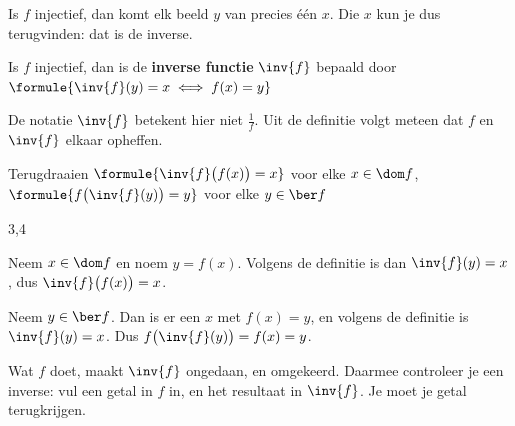 Is $f$ injectief, dan komt elk beeld $y$ van precies één $x$. Die $x$ kun je dus terugvinden: dat is de inverse.

\begin{theorie}
Is $f$ injectief, dan is de \textbf{\textcolor{accent}{inverse functie}} $\inv{f}$ bepaald door \quad $\formule{\inv{f}(y) = x \iff f(x) = y}$
\end{theorie}

De notatie $\inv{f}$ betekent hier niet $\frac{1}{f}$. Uit de definitie volgt meteen dat $f$ en $\inv{f}$ elkaar opheffen.

\begin{theorie}
\begin{stelling}{Terugdraaien}
\qquad $\formule{\inv{f}\bigl(f(x)\bigr) = x}$ voor elke $x \in \dom f$, \qquad $\formule{f\bigl(\inv{f}(y)\bigr) = y}$ voor elke $y \in \ber f$
\end{stelling}

\begin{alleenvoor}{3,4}
\begin{bewijs}
Neem $x \in \dom f$ en noem $y = f(x)$. Volgens de definitie is dan $\inv{f}(y) = x$, dus $\inv{f}\bigl(f(x)\bigr) = x$.

Neem $y \in \ber f$. Dan is er een $x$ met $f(x) = y$, en volgens de definitie is $\inv{f}(y) = x$. Dus $f\bigl(\inv{f}(y)\bigr) = f(x) = y$.
\end{bewijs}
\end{alleenvoor}
\end{theorie}

Wat $f$ doet, maakt $\inv{f}$ ongedaan, en omgekeerd. Daarmee controleer je een inverse: vul een getal in $f$ in, en het resultaat in $\inv{f}$. Je moet je getal terugkrijgen.


\begin{oefeningen}
\end{oefeningen}

